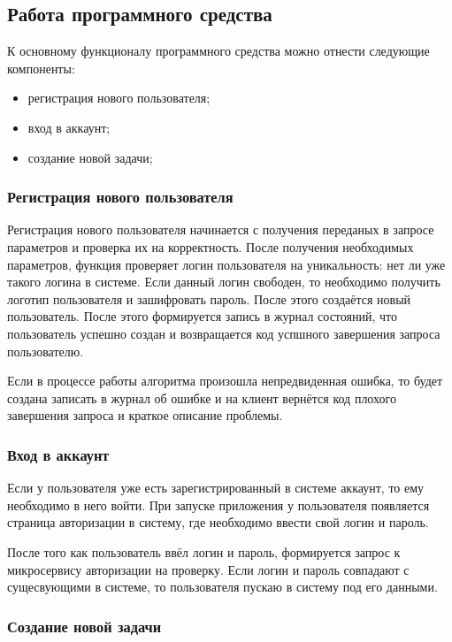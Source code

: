 \subsection{Работа программного средства}

К основному функционалу программного средства можно отнести следующие компоненты:
\begin{itemize}
    \item регистрация нового пользователя;
    \item вход в аккаунт;
    \item создание новой задачи;
\end{itemize}

\subsubsection{Регистрация нового пользователя}

Регистрация нового пользователя начинается с получения переданых в запросе параметров и проверка их на корректность.
После получения необходимых параметров, функция проверяет логин пользователя на уникальность: нет ли уже такого логина в системе.
Если данный логин свободен, то необходимо получить логотип пользователя и зашифровать пароль.
После этого создаётся новый пользователь. После этого формируется запись в журнал состояний, что пользователь успешно создан и
возвращается код успшного завершения запроса пользователю.

Если в процессе работы алгоритма произошла непредвиденная ошибка, то будет создана записать в журнал об ошибке и на клиент вернётся
код плохого завершения запроса и краткое описание проблемы.

\subsubsection{Вход в аккаунт}

Если у пользователя уже есть зарегистрированный в системе аккаунт, то ему необходимо в него войти. При запуске приложения у пользователя
появляется страница авторизации в систему, где необходимо ввести свой логин и пароль.

После того как пользователь ввёл логин и пароль, формируется запрос к микросервису авторизации на проверку. Если логин и пароль совпадают
с сущесвующими в системе, то пользователя пускаю в систему под его данными.

\subsubsection{Создание новой задачи}

